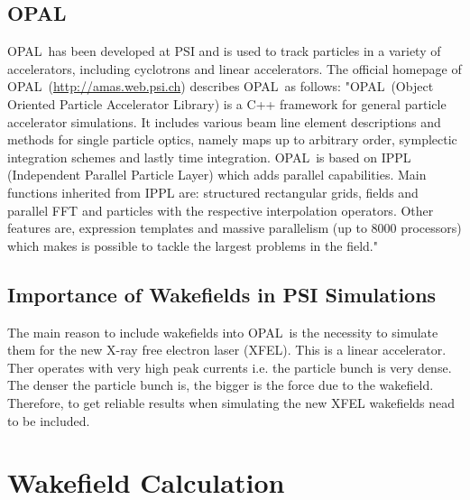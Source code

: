 \documentclass[11pt,a4paper]{article}
\newcommand{\opal}{\textsc{OPAL}}
\begin{document}
\subsection {\opal}
\opal\ has been developed at PSI and is used to track particles in a variety of accelerators, including cyclotrons and linear accelerators. The official homepage of \opal\ (\url{http://amas.web.psi.ch}) describes \opal\ as follows: 
"\opal\ (Object Oriented Particle Accelerator Library) is a C++ framework for general particle accelerator simulations. It includes various beam line element descriptions and methods for single particle optics, namely maps up to arbitrary order, symplectic integration schemes and lastly time integration. \opal\ is based on IPPL (Independent Parallel Particle Layer) which adds parallel capabilities. Main functions inherited from IPPL are: structured rectangular grids, fields and parallel FFT and particles with the respective interpolation operators. Other features are, expression templates and massive parallelism (up to 8000 processors) which makes is possible to tackle the largest problems in the field."

\subsection{Importance of Wakefields in PSI Simulations}
The main reason to include wakefields into \opal\ is the necessity to simulate them for the new X-ray free electron laser (XFEL). This is a linear accelerator. Ther operates with very high peak currents i.e. the particle bunch is very dense. The denser the particle bunch is, the bigger is the force due to the wakefield. Therefore, to get reliable results when simulating the new XFEL wakefields nead to be included. 
 



\section{Wakefield Calculation}
\end{document}
